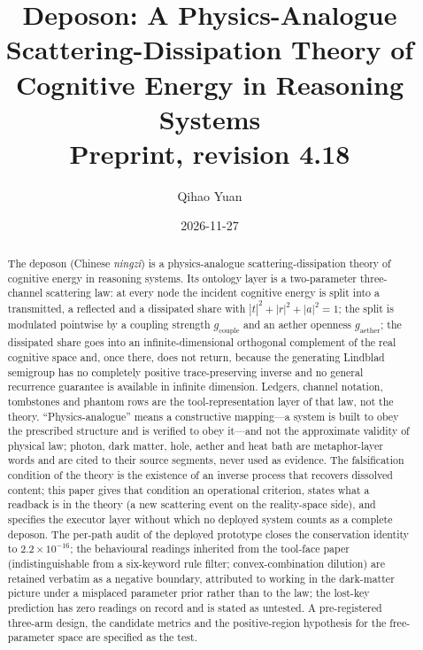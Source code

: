 \documentclass[11pt,a4paper]{article}
\title{\bfseries Deposon: A Physics-Analogue Scattering-Dissipation Theory of Cognitive Energy in Reasoning Systems\\[4pt]
\normalsize Preprint, revision 4.18}
\author{Qihao Yuan}
\date{2026-11-27}
\newcommand{\gcouple}{g_{\mathrm{couple}}}
\newcommand{\gaether}{g_{\mathrm{aether}}}
\begin{document}
\maketitle

\begin{abstract}
The deposon (Chinese \emph{ningzi}) is a physics-analogue scattering-dissipation theory of cognitive energy in reasoning systems. Its ontology layer is a two-parameter three-channel scattering law: at every node the incident cognitive energy is split into a transmitted, a reflected and a dissipated share with $|t|^2+|r|^2+|a|^2=1$; the split is modulated pointwise by a coupling strength $\gcouple$ and an aether openness $\gaether$; the dissipated share goes into an infinite-dimensional orthogonal complement of the real cognitive space and, once there, does not return, because the generating Lindblad semigroup has no completely positive trace-preserving inverse and no general recurrence guarantee is available in infinite dimension. Ledgers, channel notation, tombstones and phantom rows are the tool-representation layer of that law, not the theory. ``Physics-analogue'' means a constructive mapping---a system is built to obey the prescribed structure and is verified to obey it---and not the approximate validity of physical law; photon, dark matter, hole, aether and heat bath are metaphor-layer words and are cited to their source segments, never used as evidence. The falsification condition of the theory is the existence of an inverse process that recovers dissolved content; this paper gives that condition an operational criterion, states what a readback is in the theory (a new scattering event on the reality-space side), and specifies the executor layer without which no deployed system counts as a complete deposon. The per-path audit of the deployed prototype closes the conservation identity to $2.2\times10^{-16}$; the behavioural readings inherited from the tool-face paper (indistinguishable from a six-keyword rule filter; convex-combination dilution) are retained verbatim as a negative boundary, attributed to working in the dark-matter picture under a misplaced parameter prior rather than to the law; the lost-key prediction has zero readings on record and is stated as untested. A pre-registered three-arm design, the candidate metrics and the positive-region hypothesis for the free-parameter space are specified as the test.
\end{abstract}

\end{document}
